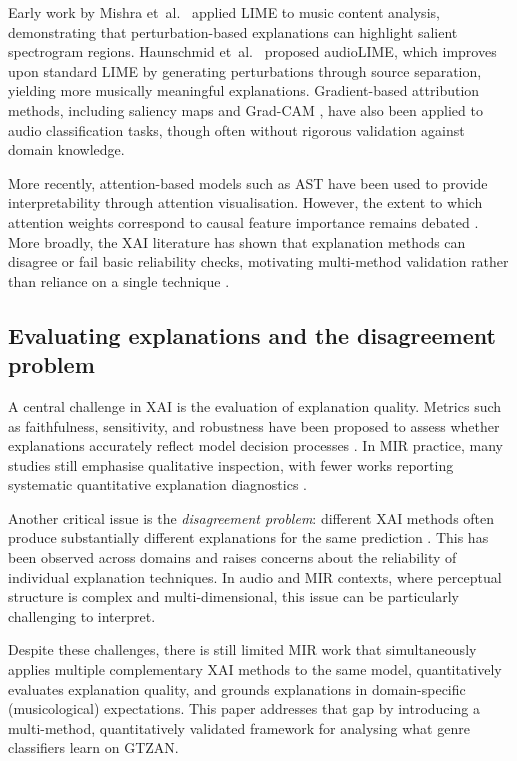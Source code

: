 \documentclass{article}
\begin{document}
Early work by Mishra et~al.\ \cite{Mishra2017} applied LIME \cite{Ribeiro2016} to music content analysis, demonstrating that perturbation-based explanations can highlight salient spectrogram regions. Haunschmid et~al.\ \cite{Haunschmid2020} proposed audioLIME, which improves upon standard LIME by generating perturbations through source separation, yielding more musically meaningful explanations. Gradient-based attribution methods, including saliency maps and Grad-CAM \cite{Selvaraju2017}, have also been applied to audio classification tasks, though often without rigorous validation against domain knowledge.

More recently, attention-based models such as AST \cite{Gong2021} have been used to provide interpretability through attention visualisation. However, the extent to which attention weights correspond to causal feature importance remains debated \cite{Jain2019}. More broadly, the XAI literature has shown that explanation methods can disagree or fail basic reliability checks, motivating multi-method validation rather than reliance on a single technique \cite{Krishna2022,Adebayo2018}.

\subsection{Evaluating explanations and the disagreement problem}

A central challenge in XAI is the evaluation of explanation quality. Metrics such as faithfulness, sensitivity, and robustness have been proposed to assess whether explanations accurately reflect model decision processes \cite{Samek2017, Hooker2019}. In MIR practice, many studies still emphasise qualitative inspection, with fewer works reporting systematic quantitative explanation diagnostics \cite{Mishra2017,Haunschmid2020}.

Another critical issue is the \textit{disagreement problem}: different XAI methods often produce substantially different explanations for the same prediction \cite{Krishna2022}. This has been observed across domains and raises concerns about the reliability of individual explanation techniques. In audio and MIR contexts, where perceptual structure is complex and multi-dimensional, this issue can be particularly challenging to interpret.

Despite these challenges, there is still limited MIR work that simultaneously applies multiple complementary XAI methods to the same model, quantitatively evaluates explanation quality, and grounds explanations in domain-specific (musicological) expectations. This paper addresses that gap by introducing a multi-method, quantitatively validated framework for analysing what genre classifiers learn on GTZAN.
\end{document}
